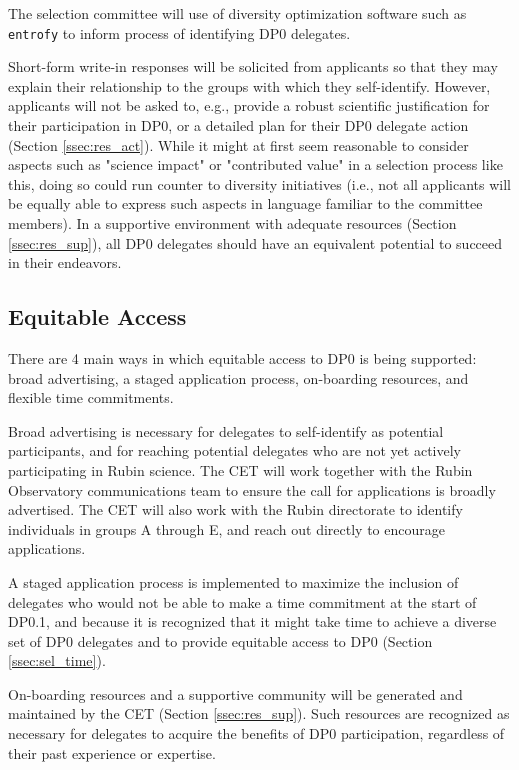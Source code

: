 \documentclass[DM,lsstdraft,authoryear,toc]{lsstdoc}
\begin{document}
The selection committee will use of diversity optimization software such as {\tt entrofy} \citep{2019arXiv190503314H} to inform process of identifying DP0 delegates.

Short-form write-in responses will be solicited from applicants so that they may explain their relationship to the groups with which they self-identify.
However, applicants will not be asked to, e.g., provide a robust scientific justification for their participation in DP0, or a detailed plan for their DP0 delegate action (Section \ref{ssec:res_act}).
While it might at first seem reasonable to consider aspects such as "science impact" or "contributed value" in a selection process like this, doing so could run counter to diversity initiatives (i.e., not all applicants will be equally able to express such aspects in language familiar to the committee members).
In a supportive environment with adequate resources (Section \ref{ssec:res_sup}), all DP0 delegates should have an equivalent potential to succeed in their endeavors.


\subsection{Equitable Access}\label{ssec:sel_equity}

There are 4 main ways in which equitable access to DP0 is being supported: broad advertising, a staged application process, on-boarding resources, and flexible time commitments.

Broad advertising is necessary for delegates to self-identify as potential participants, and for reaching potential delegates who are not yet actively participating in Rubin science.
The CET will work together with the Rubin Observatory communications team to ensure the call for applications is broadly advertised. 
The CET will also work with the Rubin directorate to identify individuals in groups A through E, and reach out directly to encourage applications. 

A staged application process is implemented to maximize the inclusion of delegates who would not be able to make a time commitment at the start of DP0.1, and because it is recognized that it might take time to achieve a diverse set of DP0 delegates and to provide equitable access to DP0 (Section \ref{ssec:sel_time}).

On-boarding resources and a supportive community will be generated and maintained by the CET (Section \ref{ssec:res_sup}).
Such resources are recognized as necessary for delegates to acquire the benefits of DP0 participation, regardless of their past experience or expertise.
\end{document}
